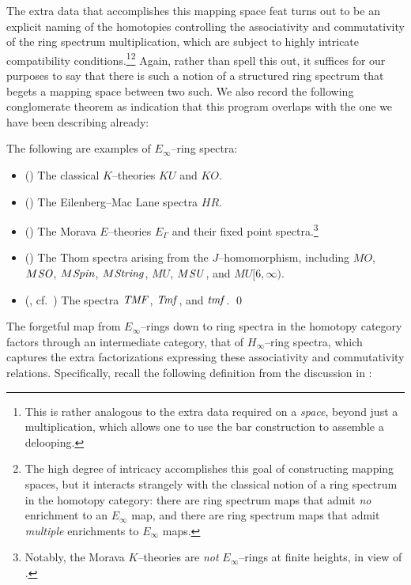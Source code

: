 The extra data that accomplishes this mapping space feat turns out to be an explicit naming of the homotopies controlling the associativity and commutativity of the ring spectrum multiplication, which are subject to highly intricate compatibility conditions.\footnote{This is rather analogous to the extra data required on a \emph{space}, beyond just a multiplication, which allows one to use the bar construction to assemble a delooping.}\footnote{The high degree of intricacy accomplishes this goal of constructing mapping spaces, but it interacts strangely with the classical notion of a ring spectrum in the homotopy category: there are ring spectrum maps that admit \emph{no} enrichment to an \(E_\infty\) map, and there are ring spectrum maps that admit \emph{multiple} enrichments to \(E_\infty\) maps.}  Again, rather than spell this out, it suffices for our purposes to say that there is such a notion of a structured ring spectrum that begets a mapping space between two such.  We also record the following conglomerate theorem as indication that this program overlaps with the one we have been describing already:
\begin{theorem}\label{OmnibusEinftyTheorem}
The following are examples of \(E_\infty\)--ring spectra:
\begin{itemize}
    \item (\cite[Section VIII.1]{MayRingSpacesSpectra}) The classical \(K\)--theories \(KU\) and \(KO\).
    \item (\cite[Section VIII.1]{MayRingSpacesSpectra}) The Eilenberg--Mac Lane spectra \(HR\).
    \item (\cite[Corollary 7.6--7]{GoerssHopkins}) The Morava \(E\)--theories \(E_\Gamma\) and their fixed point spectra.\footnote{Notably, the Morava \(K\)--theories are \emph{not} \(E_\infty\)--rings at finite heights, in view of .}
    \item (\cite[Section IV.3]{MayRingSpacesSpectra}) The Thom spectra arising from the \(J\)--homomorphism, including \(MO\), \(M\mathit{SO}\), \(M\mathit{Spin}\), \(M\mathit{String}\), \(MU\), \(M\mathit{SU}\), and \(MU[6, \infty)\).
    \item (\cite{BehrensConstruction}, cf.\ ) The spectra \(\mathit{TMF}\), \(\mathit{Tmf}\), and \(\mathit{tmf}\). \qed
\end{itemize}
\end{theorem}

The forgetful map from \(E_\infty\)--rings down to ring spectra in the homotopy category factors through an intermediate category, that of \(H_\infty\)--ring spectra, which captures the extra factorizations expressing these associativity and commutativity relations.  Specifically, recall the following definition from the discussion in :

